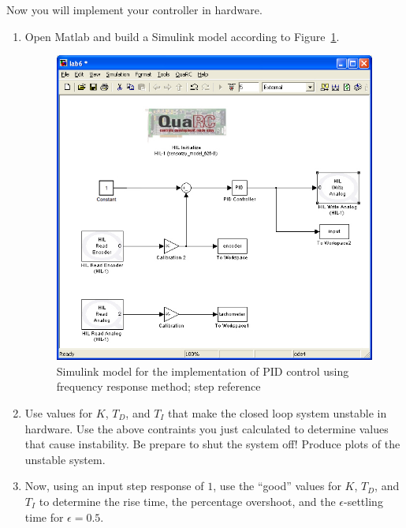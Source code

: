 Now you will implement your controller in hardware.
\begin{enumerate}
    \item Open \textsf{Matlab} and build a \textsf{Simulink} model according to
          Figure~\ref{fig:model9a}\@.
          \begin{figure}[htbp]
              \centering
              \includegraphics[width=0.6\hsize]{pix/lab9a.jpg}
              \caption{\textsf{Simulink} model for the implementation of PID control using
                  frequency response method; step reference}\label{fig:model9a}
          \end{figure}%

    \item Use values for \(K\), \(T_D\), and \(T_I\) that make the closed loop
          system unstable in hardware.  Use the above contraints you just calculated to
          determine values that cause instability.  Be prepare to shut the system off!
          Produce plots of the unstable system.

    \item Now, using an input step response of \(1\), use the ``good'' values for
          \(K\), \(T_D\), and \(T_I\) to determine the rise time, the percentage
          overshoot, and the \(\epsilon \)-settling time for \(\epsilon=0.5\).


\end{enumerate}
